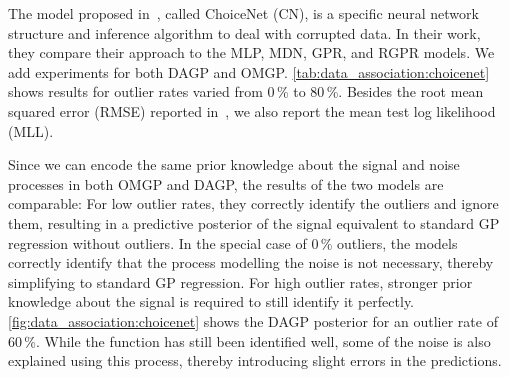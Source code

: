 The model proposed in~\parencite{choi_choicenet_2018}, called ChoiceNet (CN), is a specific neural network structure and inference algorithm to deal with corrupted data.
In their work, they compare their approach to the MLP, MDN, GPR, and RGPR models.
We add experiments for both DAGP and OMGP.
\cref{tab:data_association:choicenet} shows results for outlier rates varied from 0\,\% to 80\,\%.
Besides the root mean squared error (RMSE) reported in~\parencite{choi_choicenet_2018}, we also report the mean test log likelihood (MLL).

Since we can encode the same prior knowledge about the signal and noise processes in both OMGP and DAGP, the results of the two models are comparable:
For low outlier rates, they correctly identify the outliers and ignore them, resulting in a predictive posterior of the signal equivalent to standard GP regression without outliers.
In the special case of 0\,\% outliers, the models correctly identify that the process modelling the noise is not necessary, thereby simplifying to standard GP regression.
For high outlier rates, stronger prior knowledge about the signal is required to still identify it perfectly.
\cref{fig:data_association:choicenet} shows the DAGP posterior for an outlier rate of 60\,\%.
While the function has still been identified well, some of the noise is also explained using this process, thereby introducing slight errors in the predictions.


